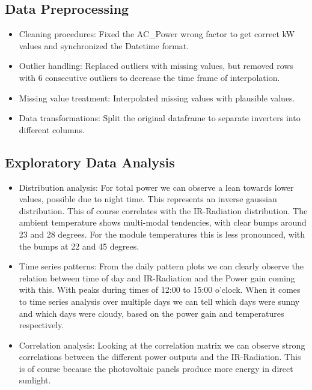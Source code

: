 \documentclass[10pt]{article}
\begin{document}
\subsection{Data Preprocessing}
\begin{itemize}
    \item Cleaning procedures: Fixed the AC\_Power wrong factor to get correct kW values and synchronized the Datetime format.
    \item Outlier handling: Replaced outliers with missing values, but removed rows with 6 consecutive outliers to decrease the time frame of interpolation.
    \item Missing value treatment: Interpolated missing values with plausible values.
    \item Data transformations: Split the original dataframe to separate inverters into different columns.
\end{itemize}

\subsection{Exploratory Data Analysis}
\begin{itemize}
    \item Distribution analysis: For total power we can observe a lean towards lower values, possible due to night time. This represents an inverse gaussian distribution. This of course correlates with the IR-Radiation distribution. The ambient temperature shows multi-modal tendencies, with clear bumps around 23 and 28 degrees. For the module temperatures this is less pronounced, with the bumps at 22 and 45 degrees.
    \item Time series patterns: From the daily pattern plots we can clearly observe the relation between time of day and IR-Radiation and the Power gain coming with this. With peaks during times of 12:00 to 15:00 o'clock. When it comes to time series analysis over multiple days we can tell which days were sunny and which days were cloudy, based on the power gain and temperatures respectively.
    \item Correlation analysis: Looking at the correlation matrix we can observe strong correlations between the different power outputs and the IR-Radiation. This is of course because the photovoltaic panels produce more energy in direct sunlight.
\end{itemize}
\end{document}
